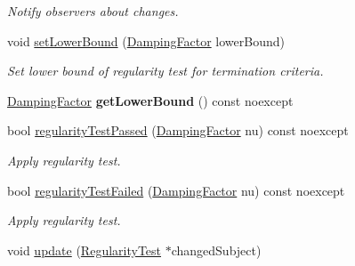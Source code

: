 \begin{DoxyCompactItemize}
\begin{DoxyCompactList}\small\item\em \-Notify observers about changes. \end{DoxyCompactList}\item 
\hypertarget{classSpacy_1_1Mixin_1_1RegularityTest_a682ce022b0b5493e48f50f693ed64082}{void \hyperlink{classSpacy_1_1Mixin_1_1RegularityTest_a682ce022b0b5493e48f50f693ed64082}{set\-Lower\-Bound} (\hyperlink{classSpacy_1_1DampingFactor}{\-Damping\-Factor} lower\-Bound)}\label{classSpacy_1_1Mixin_1_1RegularityTest_a682ce022b0b5493e48f50f693ed64082}

\begin{DoxyCompactList}\small\item\em \-Set lower bound of regularity test for termination criteria. \end{DoxyCompactList}\item 
\hypertarget{classSpacy_1_1Mixin_1_1RegularityTest_a576995201badbfaee2064bf0d7749257}{\hyperlink{classSpacy_1_1DampingFactor}{\-Damping\-Factor} {\bfseries get\-Lower\-Bound} () const noexcept}\label{classSpacy_1_1Mixin_1_1RegularityTest_a576995201badbfaee2064bf0d7749257}

\item 
bool \hyperlink{classSpacy_1_1Mixin_1_1RegularityTest_acb6b3e8c76ebdbded0ec610959513caf}{regularity\-Test\-Passed} (\hyperlink{classSpacy_1_1DampingFactor}{\-Damping\-Factor} nu) const noexcept
\begin{DoxyCompactList}\small\item\em \-Apply regularity test. \end{DoxyCompactList}\item 
bool \hyperlink{classSpacy_1_1Mixin_1_1RegularityTest_aeb1a3b051bafc9da9be1df354c652812}{regularity\-Test\-Failed} (\hyperlink{classSpacy_1_1DampingFactor}{\-Damping\-Factor} nu) const noexcept
\begin{DoxyCompactList}\small\item\em \-Apply regularity test. \end{DoxyCompactList}\item 
\hypertarget{classSpacy_1_1Mixin_1_1RegularityTest_a1a6191e20f84025cec8b10ec63ab94ac}{void \hyperlink{classSpacy_1_1Mixin_1_1RegularityTest_a1a6191e20f84025cec8b10ec63ab94ac}{update} (\hyperlink{classSpacy_1_1Mixin_1_1RegularityTest_a548d9d45c31c7833266bd3b20dc1aa7e}{\-Regularity\-Test} $\ast$changed\-Subject)}\label{classSpacy_1_1Mixin_1_1RegularityTest_a1a6191e20f84025cec8b10ec63ab94ac}


\end{DoxyCompactItemize}

